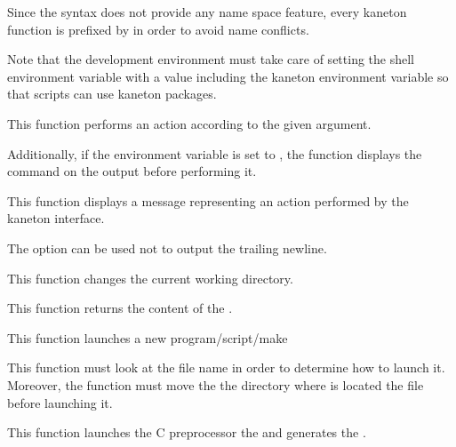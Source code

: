 Since the  syntax does not provide any name space feature,
every kaneton  function is prefixed by  in order
to avoid name conflicts.

Note that the  development environment must take care of
setting the  shell environment variable with a value
including the  kaneton environment variable
so that scripts can use kaneton  packages.

         {
           This function performs an action according to the given
            argument.

           \-

           Additionally, if the  environment variable is
           set to , the function displays the
           command on the output before performing it.
         }

         {
	   This function displays a message representing an action performed
	   by the kaneton  interface.

	   \-

	   The option  can be used not to
	   output the trailing newline.
	 }

         {
	   This function changes the current working directory.
	 }

         {
	   This function returns the content of the .
	 }

         {
	   This function launches a new program/script/make \etc{}

	   \-

	   This function must look at the file name in order to determine
	   how to launch it. Moreover, the function must move the the
	   directory where is located the file before launching it.
	 }

         {
	   This function launches the C preprocessor the 
	   and generates the .
	 }

